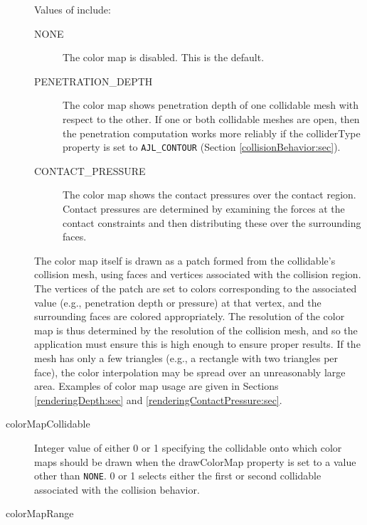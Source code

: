 \begin{description}
Values of
include:

\begin{description}

\item[NONE]\mbox{}

The color map is disabled. This is the default.

\item[PENETRATION\_DEPTH]\mbox{}

The color map shows penetration depth of one collidable mesh with
respect to the other. If one or both collidable meshes are open, then
the penetration computation works more reliably if the {\sf
colliderType} property is set to {\tt AJL\_CONTOUR} (Section
\ref{collisionBehavior:sec}).

\item[CONTACT\_PRESSURE]\mbox{}

The color map shows the contact pressures over the contact region.
Contact pressures are determined by examining the forces at the
contact constraints and then distributing these over the surrounding
faces.

\end{description}

The color map itself is drawn as a patch formed from the collidable's
collision mesh, using faces and vertices associated with the collision
region. The vertices of the patch are set to colors corresponding to
the associated value (e.g., penetration depth or pressure) at that
vertex, and the surrounding faces are colored appropriately.  The
resolution of the color map is thus determined by the resolution of
the collision mesh, and so the application must ensure this is high
enough to ensure proper results. If the mesh has only a few triangles
(e.g., a rectangle with two triangles per face), the color
interpolation may be spread over an unreasonably large area.  Examples
of color map usage are given in Sections \ref{renderingDepth:sec} and
\ref{renderingContactPressure:sec}.

\item[colorMapCollidable]

Integer value of either 0 or 1 specifying the collidable onto which color
maps should be drawn when the {\sf drawColorMap} property is set to a
value other than {\tt NONE}. 0 or 1 selects either the first or second
collidable associated with the collision behavior.

\item[colorMapRange]\mbox{}


\end{description}
